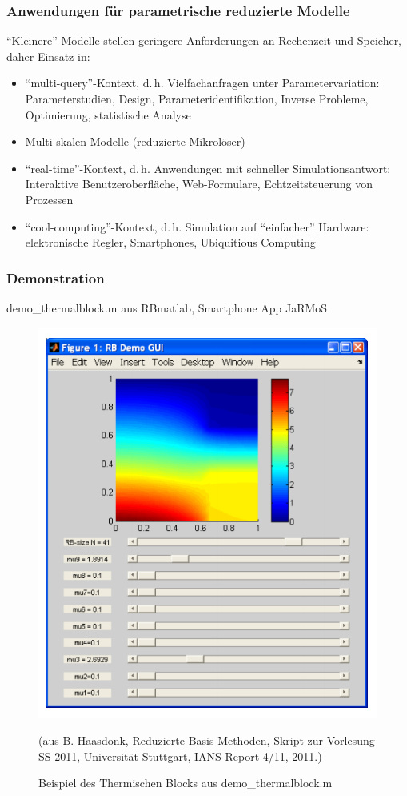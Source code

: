 \subsubsection*{Anwendungen für parametrische reduzierte Modelle}
\label{Anwendungen für parameterische reduzierte Modelle}

"`Kleinere"' Modelle stellen geringere Anforderungen an Rechenzeit und Speicher, daher Einsatz in:

\begin{itemize}
	\item "`multi-query"'-Kontext, d.\,h. Vielfachanfragen unter Parametervariation: Parameterstudien, Design, Parameteridentifikation, Inverse Probleme, Optimierung, statistische Analyse
	\item Multi-skalen-Modelle (reduzierte Mikrolöser)
	\item "`real-time"'-Kontext, d.\,h. Anwendungen mit schneller Simulationsantwort: Interaktive Benutzeroberfläche, Web-Formulare, Echtzeitsteuerung von Prozessen
	\item "`cool-computing"'-Kontext, d.\,h. Simulation auf "`einfacher"' Hardware: elektronische Regler, Smartphones, Ubiquitious Computing
\end{itemize}

\subsubsection*{Demonstration}
\label{Demonstration}

\textsf{demo\_thermalblock.m} aus \textsf{RBmatlab}, Smartphone App JaRMoS

\begin{figure}[H]
  \centering\small
    \includegraphics[width = 0.7 \textwidth]{Bilder/ThermoBlock.png}
  \caption{Beispiel des Thermischen Blocks aus \textsf{demo\_thermalblock.m}}{(aus B. Haasdonk, Reduzierte-Basis-Methoden, Skript zur Vorlesung SS 2011, Universität Stuttgart, IANS-Report 4/11, 2011.)}
  \label{fig:ThermoBlock}
\end{figure}


